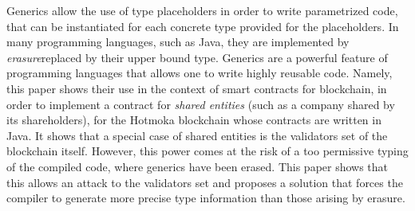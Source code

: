Generics allow the use of type placeholders in order
to write parametrized code, that can be instantiated for each
concrete type provided for the placeholders. In many
programming languages, such as Java, they are implemented by
\emph{erasure}\ie replaced by their upper bound type.
Generics are a powerful feature of programming languages that allows one
to write highly reusable code. Namely, this paper shows their use in the
context of smart contracts for blockchain, in order to implement
a contract for \emph{shared entities} (such as a company shared
by its shareholders),
for the Hotmoka blockchain whose contracts are written in Java.
It shows that a special case of shared entities is the validators set of
the blockchain itself. However, this power comes at the risk of a too permissive
typing of the compiled code, where generics have been erased.
This paper shows
that this allows an attack to the validators set and proposes a solution
that forces the compiler to generate more precise type information than
those arising by erasure.
